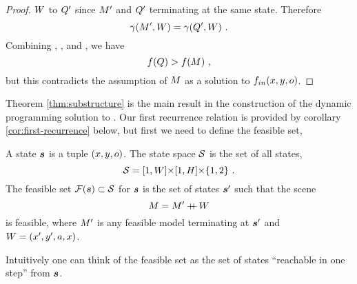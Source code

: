 \begin{proof}
  $\Wall$ to $\CfTruncScene$ since $\TruncScene$ and $\CfTruncScene$
  terminating at the same state. Therefore
  \begin{equation}
    \label{eq:equal-penalties}
    \CornerPenalty(\TruncScene,\Wall) =
    \CornerPenalty(\CfTruncScene,\Wall) ~.
  \end{equation}
  Combining , , and
  , we have
  \begin{equation}
    \Objective(\CfScene) > \Objective(\Scene) ~,
  \end{equation}
  but this contradicts the assumption of $\Scene$ as a solution to
  $\SubProbIN(x,y,\WallOrient)$.
\end{proof}

Theorem \ref{thm:substructure} is the main result in the construction
of the dynamic programming solution to . Our first
recurrence relation is provided by corollary
\ref{cor:first-recurrence} below, but first we need to define the
feasible set,
\begin{definition}
  A state $\State$ is a tuple $(x,y,\WallOrient)$. The state space
  $\StateSpace$ is the set of all states,
  \begin{equation}
    \StateSpace = [1,\Width] \cross [1,\Height] \cross \{1,2\} ~.
  \end{equation}
  The feasible set $\FeasibleSet(\State) \subset \StateSpace$ for
  $\State$ is the set of states $\State'$ such that the scene
  \begin{equation}
    \Scene = \Scene' \concat \Wall
  \end{equation}
  is feasible, where $\Scene'$ is any feasible model terminating at
  $\State'$ and $\Wall=(x',y',a,x)$.
\end{definition}

Intuitively one can think of the feasible set as the set of states
``reachable in one step'' from $\State$.

